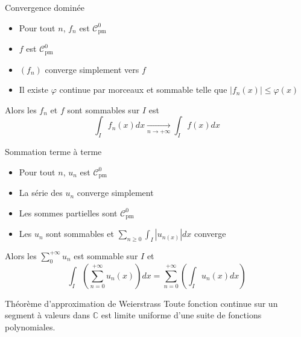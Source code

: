 \documentclass[french, a4paper, 10pt, twocolumn]{article}
\newcommand{\C}{\mathbb{C}}   %
\newcommand{\czero}{\mathcal{C}^{0}}
\newcommand{\po}{\left(}         %
\newcommand{\pf}{\right)}        %
\newcommand{\pof}[1]{\po #1 \pf} %
\renewcommand{\phi}{\varphi}
\begin{document}
\begin{theoreme}{Convergence dominée}
  \begin{itemize}[label=$\bullet$]
    \item Pour tout $n$, $f_{n}$ est $\czero_{\text{pm}}$
    \item $f$ est $\czero_{\text{pm}}$
    \item $(f_{n})$ converge simplement vers $f$
    \item Il existe $\phi$ continue par morceaux et sommable telle que \(\left\lvert f_{n}(x)\right\rvert\leqslant \phi(x)\)
  \end{itemize}
  \tcblower
  Alors les $f_{n}$ et $f$ sont sommables sur $I$ est
  \[\int_{I}f_{n}(x)dx\xrightarrow[n\rightarrow +\infty]{}\int_{I}f(x)dx\]
\end{theoreme}

\begin{theoreme}{Sommation terme à terme}
  \begin{itemize}[label=$\bullet$]
    \item Pour tout $n$, $u_{n}$ est $\czero_{\text{pm}}$
    \item La série des $u_{n}$ converge simplement
    \item Les sommes partielles sont $\czero_{\text{pm}}$
    \item Les $u_{n}$ sont sommables et $\sum_{n\geqslant 0}\int_I |u_{n(x)}|dx$ converge

  \end{itemize}
  \tcblower
  Alors les $\sum\limits_{0}^{+\infty}u_{n}$ est sommable sur $I$ et
  \[\int_{I}\pof{\sum_{n=0}^{+\infty}u_{n}(x)}dx = \sum_{n=0}^{+\infty} \pof{\int_{I}u_{n}(x)dx}\]
\end{theoreme}

\begin{theoreme}{Théorème d'approximation de Weierstrass}
    Toute fonction continue sur un segment à valeurs dans \(\C\) est limite uniforme d'une suite de fonctions polynomiales.
\end{theoreme}
\end{document}
